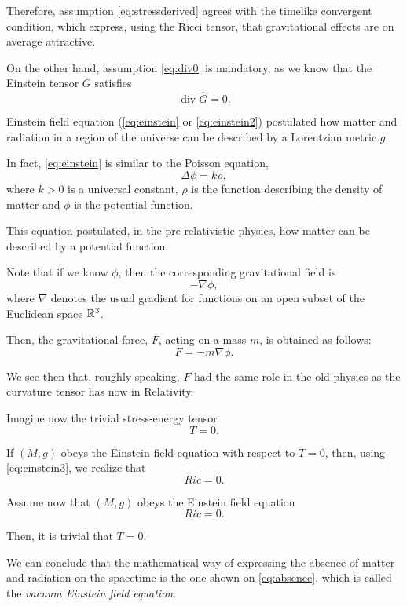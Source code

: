 Therefore, assumption \ref{eq:stressderived} agrees with the timelike convergent condition, which express, using the Ricci tensor, that gravitational effects are on average attractive.

On the other hand, assumption \ref{eq:div0} is mandatory, as we know that the Einstein tensor $G$ satisfies
\[
	\operatorname{div} \hat{G} = 0.
\]

Einstein field equation (\autoref{eq:einstein} or \autoref{eq:einstein2}) postulated how matter and radiation in a region of the universe can be described by a Lorentzian metric $g$.

In fact, \autoref{eq:einstein} is similar to the Poisson equation,
\[
	\Delta\phi = k\rho,
\]
where $k>0$ is a universal constant, $\rho$ is the function describing the density of matter and $\phi$ is the potential function.

This equation postulated, in the pre-relativistic physics, how matter can be described by a potential function.

Note that if we know $\phi$, then the corresponding gravitational field is 
\[
	-\nabla \phi,
\]
where $\nabla$ denotes the usual gradient for functions on an open subset of the Euclidean space $\mathbb{R}^3$.

Then, the gravitational force, $F$, acting on a mass $m$, is obtained as follows:
\[
	F = -m\nabla\phi.
\]

We see then that, roughly speaking, $F$ had the same role in the old physics as the curvature tensor has now in Relativity.

Imagine now the trivial stress-energy tensor
\[
	T = 0.
\]

If $(M,g)$ obeys the Einstein field equation with respect to $T = 0$, then, using \autoref{eq:einstein3}, we realize that
\[
	Ric = 0.
\]

Assume now that $(M,g)$ obeys the Einstein field equation
\begin{equation}
	\label{eq:absence}
	Ric = 0.
\end{equation}

Then, it is trivial that $T=0$.

We can conclude that the mathematical way of expressing the absence of matter and radiation on the spacetime is the one shown on \autoref{eq:absence}, which is called the \emph{vacuum Einstein field equation}.